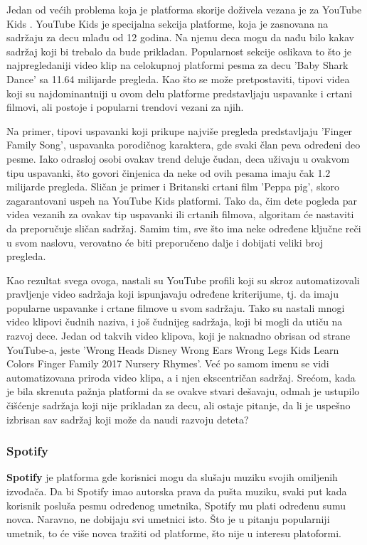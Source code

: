 \documentclass[a4paper]{article}
\begin{document}
Jedan od većih problema koja je platforma skorije doživela vezana je za YouTube Kids \cite{youtube}. YouTube Kids je specijalna sekcija platforme, koja je zasnovana na sadržaju za decu mlađu od 12 godina. Na njemu deca mogu da nađu bilo kakav sadržaj koji bi trebalo da bude prikladan. Popularnost sekcije oslikava to što je najpregledaniji video klip na celokupnoj platformi pesma za decu 'Baby Shark Dance' sa 11.64 milijarde pregleda. Kao što se može pretpostaviti, tipovi videa koji su najdominantniji u ovom delu platforme predstavljaju uspavanke i crtani filmovi, ali postoje i popularni trendovi vezani za njih. 

Na primer, tipovi uspavanki koji prikupe najviše pregleda predstavljaju 'Finger Family Song', uspavanka porodičnog karaktera, gde svaki član peva određeni deo pesme. Iako odrasloj osobi ovakav trend deluje čudan, deca uživaju u ovakvom tipu uspavanki, što govori činjenica da neke od ovih pesama imaju čak 1.2 milijarde pregleda. Sličan je primer i Britanski crtani film 'Peppa pig', skoro zagarantovani uspeh na YouTube Kids platformi. Tako da, čim dete pogleda par videa
vezanih za ovakav tip uspavanki ili crtanih filmova, algoritam će nastaviti da preporučuje sličan sadržaj. Samim tim, sve što ima neke određene ključne reči u svom naslovu, verovatno će biti preporučeno dalje i dobijati veliki broj pregleda.

Kao rezultat svega ovoga, nastali su YouTube profili koji su skroz automatizovali pravljenje video sadržaja koji ispunjavaju određene kriterijume, tj. da imaju popularne uspavanke i crtane filmove u svom sadržaju. Tako su nastali mnogi video klipovi čudnih naziva, i još čudnijeg sadržaja, koji bi mogli da utiču na razvoj dece. Jedan od takvih video klipova, koji je naknadno obrisan od strane YouTube-a, jeste 'Wrong Heads Disney Wrong Ears Wrong Legs Kids Learn Colors Finger Family 2017 Nursery Rhymes'. Već po samom imenu se vidi automatizovana priroda video klipa, a i njen ekscentričan sadržaj.
Srećom, kada je bila skrenuta pažnja platformi da se ovakve stvari dešavaju, odmah je ustupilo čišćenje sadržaja koji nije prikladan za decu, ali ostaje pitanje, da li je uspešno izbrisan sav sadržaj koji može da naudi razvoju deteta? 

\subsubsection{Spotify}
\textbf{Spotify} je platforma gde korisnici mogu da slušaju muziku svojih omiljenih izvođača. Da bi Spotify imao autorska prava da pušta muziku, svaki put kada korisnik posluša pesmu određenog umetnika, Spotify mu plati određenu sumu novca. Naravno, ne dobijaju svi umetnici isto. Što je u pitanju popularniji umetnik, to će više novca tražiti od platforme, što nije u interesu platoformi. 
\end{document}
